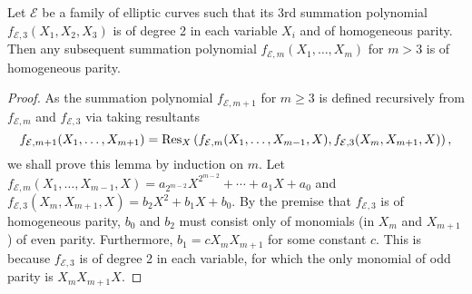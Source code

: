 %
\begin{lemma}
  \label{th:summation-polynomial}
  Let $\mathcal E$ be a family of elliptic curves such that its 3rd
  summation polynomial $f_{\mathcal E,3}(X_1,X_2,X_3)$ is of degree 2
  in each variable $X_i$ and of homogeneous parity.
  Then any subsequent summation polynomial
  $f_{\mathcal E,m}(X_1,\ldots,X_m)$ for $m>3$ is of homogeneous
  parity.
\end{lemma}
% 
\begin{proof}
  As the summation polynomial $f_{\mathcal E,m+1}$ for $m\geq 3$ is
  defined recursively from $f_{\mathcal E,m}$ and $f_{\mathcal E,3}$
  via taking resultants
  \[ f_{\mathcal E,m+1}(X_1,\dots,X_{m+1}) = \operatorname{Res}_X\left(f_{\mathcal
        E,m}(X_1,\dots,X_{m-1},X),f_{\mathcal
        E,3}(X_m,X_{m+1},X)\right), \]
  we shall prove this lemma by induction on $m$.
  Let
  $f_{\mathcal
    E,m}(X_1,\ldots,X_{m-1},X)=a_{2^{m-2}}X^{2^{m-2}}+\cdots+a_1X+a_0$
  and $f_{\mathcal E,3}(X_m,X_{m+1},X)=b_2X^2+b_1X+b_0$.
  By the premise that $f_{\mathcal E,3}$ is of homogeneous parity,
  $b_0$ and $b_2$ must consist only of monomials (in $X_m$ and
  $X_{m+1}$) of even parity.
  Furthermore, $b_1=cX_mX_{m+1}$ for some constant $c$.
  This is because $f_{\mathcal E,3}$ is of degree 2 in each variable,
  for which the only monomial of odd parity is $X_mX_{m+1}X$.


\end{proof}
